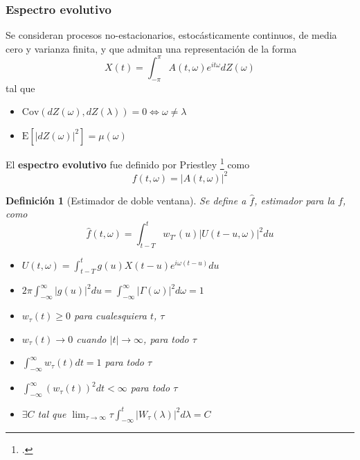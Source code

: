 \documentclass[serif,mathserif,professionalfont]{beamer}
\newtheorem{definicion}{Definición}
\newcommand{\intPI}{\int_{-\pi}^{\pi}}
\newcommand{\est}[1]{\widehat{ #1 }}
\newcommand{\E}[1]{\mathrm{E}\left[ #1 \right]}
\newcommand{\Cov}[1]{\mathrm{Cov}\left( #1 \right)}
\newcommand{\abso}[1]{\left| #1 \right|}
\begin{document}
\begin{frame}\frametitle{Espectro evolutivo}
Se consideran procesos no-estacionarios, estoc\'asticamente continuos, de media cero y varianza 
finita, y que admitan una representaci\'on de la forma
\begin{equation*}
X(t) = \intPI A(t,\omega) e^{i t \omega} dZ(\omega)
\end{equation*}
tal que 
\begin{itemize}
\item $\Cov{dZ(\omega),dZ(\lambda)} = 0 \Leftrightarrow \omega \neq \lambda$
\item $\E{\abso{dZ(\omega)}^{2}} = \mu(\omega)$
\end{itemize}

El \textbf{espectro evolutivo} fue definido por Priestley \footcite{Priestley65} como
\begin{equation*}
f(t,\omega) = \abso{A(t,\omega)}^{2}
\end{equation*}
\end{frame}


\begin{frame}%
\begin{definicion}[Estimador de doble ventana]
Se define a $\est{f}$, estimador para la $f$, como
\begin{equation*}
\widehat{f}(t,\omega) = \int_{t-T}^{t} w_{T'}(u) \lvert U(t-u,\omega) \lvert^{2} du
\end{equation*}

\begin{itemize}
\item $U(t,\omega) = \int_{t-T}^{t} g(u) X({t-u}) e^{i \omega (t-u)} du$

\item $2\pi \int_{-\infty}^{\infty} \lvert g(u) \lvert^{2} du = 
\int_{-\infty}^{\infty} \lvert \Gamma(\omega) \lvert^{2} d\omega = 1$
\item $w_{\tau}(t) \geq 0$ para cualesquiera $t$, $\tau$
\item $w_{\tau}(t) \rightarrow 0$ cuando $\lvert t \lvert \rightarrow \infty$, para todo $\tau$
\item $\int_{-\infty}^{\infty} w_{\tau}(t) dt = 1$ para todo $\tau$
\item $ \int_{-\infty}^{\infty} \left( w_{\tau}(t) \right)^{2} dt < \infty$ para todo $\tau$
\item $\exists C$ tal que  
$ \lim_{\tau\rightarrow\infty} \tau \int_{-\infty}^{t} \abso{ W_{\tau}(\lambda) }^{2} d\lambda = C$
\end{itemize}
\end{definicion}
\end{frame}
\end{document}
